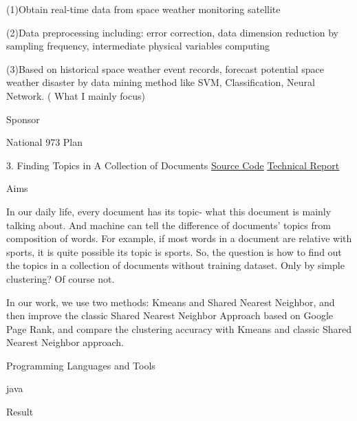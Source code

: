 \documentclass[10pt,letterpaper]{article}
\renewenvironment{itemize}{
  \begin{list}{}{
    \setlength{\leftmargin}{1.5em}
    \setlength{\itemsep}{0.25em}
    \setlength{\parskip}{0pt}
    \setlength{\parsep}{0.25em}
  }
}{
  \end{list}
}
\begin{document}
\begin{itemize}
\begin{itemize}
\begin{itemize}
	\begin{itemize}
		\item (1)Obtain real-time data from space weather monitoring satellite
		\item (2)Data preprocessing including: error correction, data dimension reduction by sampling frequency, intermediate physical variables computing
		\item (3)Based on historical space weather event records, forecast potential space  weather disaster by data mining method like SVM, Classification, Neural Network. ( What I mainly focus)
	\end{itemize}
	\end{itemize}

	\item Sponsor
		\begin{itemize}
		\item National 973 Plan
		\end{itemize}
	\end{itemize}

\item 3. Finding Topics in A Collection of Documents \href{http://github.com/pipifuyj/topicfinding}{\underline {Source Code}}  \href{http://sites.google.com/site/pipifuyj/documents/TopicFindingReport.pdf?att
irects=0}{\underline {Technical Report}}
	\begin{itemize}

	\item Aims
		\begin{itemize}
		\item In our daily life, every document has its topic- what this document is mainly talking about. And machine can tell the difference of  documents' topics from composition of words. For example, if most words in a document are relative with sports, it is quite possible its topic is sports. So, the question is how to find out the topics in a collection of documents without training dataset. Only by simple clustering? Of course not.
	 	\item In our work, we use two methods: Kmeans and Shared Nearest Neighbor, and then improve the classic Shared Nearest Neighbor Approach based on Google Page Rank, and compare the clustering accuracy with Kmeans and classic Shared Nearest Neighbor approach.
		\end{itemize}

	\item Programming Languages and Tools
		\begin{itemize}
		\item java
		\end{itemize}

	\item Result

	\end{itemize}

\end{itemize}
\end{document}
